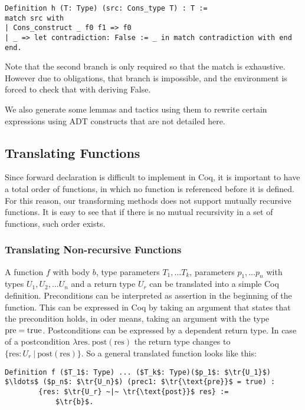 \begin{lstlisting}[style=myCoqstyle]  
Definition h (T: Type) (src: Cons_type T) : T :=
match src with
| Cons_construct _ f0 f1 => f0
| _ => let contradiction: False := _ in match contradiction with end
end. 
\end{lstlisting}

Note that the second branch is only required so that the match is exhaustive. However due to obligations, that branch is impossible, and the environment is forced to check that with deriving False. 

We also generate some lemmas and tactics using them to rewrite certain expressions using ADT constructs that are not detailed here. %


\subsection{Translating Functions}

Since forward declaration is difficult to implement in Coq, it is important to have a total order of functions, in which no function is referenced before it is defined. For this reason, our transforming methods does not support mutually recursive functions. It is easy to see that if there is no mutual recursivity in a set of functions, such order exists.

\subsubsection{Translating Non-recursive Functions}

A function $f$ with body $b$, type parameters $T_1, \ldots T_k$, parameters $p_1, \ldots p_n$ with types $U_1, U_2, \ldots U_n$ and a return type $U_r$ can be translated into a simple Coq definition.
%
Preconditions can be interpreted as assertion in the beginning of the function. This can be expressed in Coq by taking an argument that states that the precondition holds, in oder means, taking an argument with the type $\text{pre} = \text{true}$.
%
Postconditions can be expressed by a dependent return type. In case of a postcondition  $\lambda  \text{res}. ~\text{post}( \text{res})$ the return type changes to $\{\text{res}: U_r ~|~ \text{post}( \text{res})\}$. 
%
So a general translated function looks like this:
\begin{lstlisting}[style=myCoqstyle]  
Definition f ($T_1$: Type) ... ($T_k$: Type)($p_1$: $\tr{U_1}$) $\ldots$ ($p_n$: $\tr{U_n}$) (prec1: $\tr{\text{pre}}$ = true) : 
		{res: $\tr{U_r} ~|~ \tr{\text{post}}$ res} :=
			$\tr{b}$.
\end{lstlisting}

